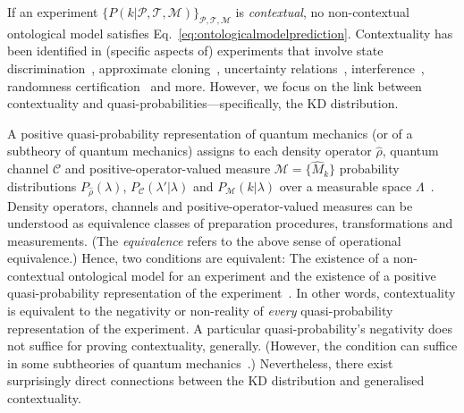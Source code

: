 \documentclass[%
 reprint,
superscriptaddress,
nofootinbib,
bibnotes,
 amsmath,amssymb,
 aps,
]{revtex4-1}
\theoremstyle{plain}
\begin{document}
If an experiment $\{P(k|{\mathscr{P}},{\mathscr{T}},{\mathscr{M}}) \}_{{\mathscr{P}},{\mathscr{T}},{\mathscr{M}}}$ is \emph{contextual}, 
no non-contextual ontological model satisfies Eq.~\eqref{eq:ontologicalmodelprediction}. 
Contextuality has been identified in (specific aspects of) experiments that involve state discrimination~\cite{schmid2018contextual,flatt2022contextual}, approximate cloning~\cite{lostaglio2020contextual}, uncertainty relations~\cite{catani2022nonclassical}, interference~\cite{flatt2022contextual}, randomness certification~\cite{i2022quantum} and more. However, we focus  on the link between contextuality and quasi-probabilities---specifically, the KD distribution.
 
A positive quasi-probability representation of quantum mechanics (or of a subtheory of quantum mechanics) assigns to each density operator $\hat{\rho}$, quantum channel $\mathcal{C}$ and positive-operator-valued measure $\mathcal{M}= \{ \hat{M}_k \}$   probability distributions $P_{\hat{\rho}}(\lambda)$, $P_{\mathcal{C}}(\lambda'|\lambda)$ and $P_{\mathcal{M}}(k|\lambda)$ over a measurable space $\Lambda$~\cite{Ferrie2011}. Density operators, channels and positive-operator-valued measures can be understood as equivalence classes of preparation procedures, transformations and measurements. (The \emph{equivalence} refers to the above sense of operational equivalence.) 
Hence, two conditions are equivalent: The existence of a non-contextual ontological model for an experiment and the existence of a positive quasi-probability representation of the experiment~\cite{spekkens2008negativity}.  
In other words, contextuality is equivalent to the negativity or non-reality of \emph{every} quasi-probability representation of the experiment. 
A particular quasi-probability's negativity
does not suffice for proving contextuality, generally. (However, the condition can suffice in some subtheories of quantum mechanics~\cite{schmid2022uniqueness}.) Nevertheless, there exist surprisingly direct connections between the KD distribution and generalised contextuality.
\end{document}
